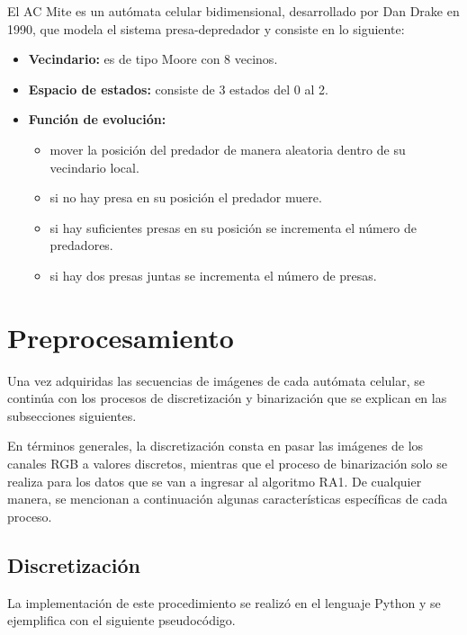 El AC Mite es un autómata celular bidimensional, desarrollado por Dan Drake en 1990, que modela el sistema presa-depredador y consiste en lo siguiente:
\begin{itemize}
	\item \textbf{Vecindario:} es de tipo Moore con 8 vecinos.
	\item \textbf{Espacio de estados:} consiste de 3 estados del 0 al 2.
	\item \textbf{Función de evolución:} 
	\begin{itemize}
		\item mover la posición del predador de manera aleatoria dentro de su vecindario local.
		\item si no hay presa en su posición el predador muere.
		\item si hay suficientes presas en su posición se incrementa el número de predadores.
		\item si hay dos presas juntas se incrementa el número de presas.
	\end{itemize}
\end{itemize}

\section{Preprocesamiento}
Una vez adquiridas las secuencias de imágenes de cada autómata celular, se continúa con los procesos de discretización y binarización que se explican en las subsecciones siguientes.

En términos generales, la discretización consta en pasar las imágenes de los canales RGB a valores discretos, mientras que el proceso de binarización solo se realiza para los datos que se van a ingresar al algoritmo RA1. De cualquier manera, se mencionan a continuación algunas características específicas de cada proceso.

\subsection{Discretización}

La implementación de este procedimiento se realizó en el lenguaje Python y se ejemplifica con el siguiente pseudocódigo.

